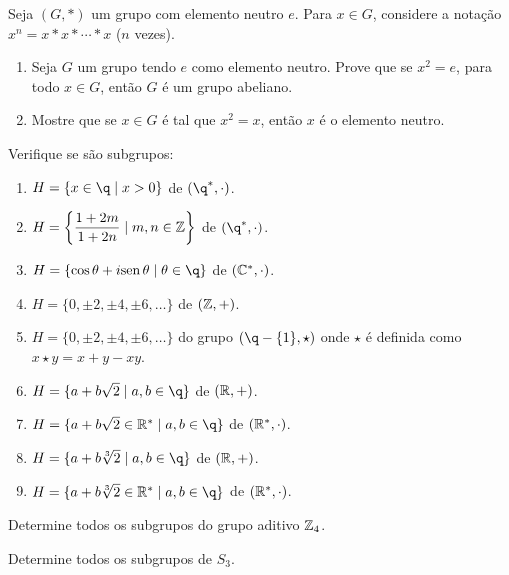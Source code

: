 \documentclass[12pt]{article}
\begin{document}
\vesp

\questao Seja $(G,*)$ um grupo com elemento neutro $e$. Para $x\in
G$, considere a nota{\c c}{\~a}o $x^n=x*x*\cdots *x$ ($n$ vezes).
\begin{enumerate}[label=({\alph*})]
\item Seja $G$ um grupo tendo $e$ como elemento neutro. Prove que se
$x^2=e$, para todo $x\in G$, ent{\~a}o $G$ {\'e} um grupo abeliano.
\item Mostre que se $x\in G$ {\'e} tal que $x^2=x$, ent{\~a}o $x$ {\'e} o elemento neutro.
\end{enumerate}

\vesp

\questao Verifique se s\~ao subgrupos:
\begin{enumerate}[label=({\alph*})]
	\item $H = \{x \in \q \mid x > 0\}$ de $(\q^*,\cdot)$.
	\item $H = \left\{\dfrac{1 + 2m}{1 + 2n} \mid m, n \in \mathbb{Z}\right\}$ de $(\q^*,\cdot)$.
	\item $H = \{\cos\theta + i\sin\theta \mid \theta \in \q\}$ de $(\mathbb{C}^*,\cdot)$.
	\item $H = \{0, \pm 2, \pm 4, \pm 6, \dots\}$ de $(\mathbb{Z},+)$.
	\item $H = \{0, \pm 2, \pm 4, \pm 6, \dots\}$ do grupo $(\q - \{1\},\star)$ onde $\star$ \'e definida como $x \star y = x + y - xy$.
	\item $H = \{a + b\sqrt{2} \mid a, b \in \q\}$ de $(\mathbb{R},+)$.
	\item $H = \{a + b\sqrt{2} \in \real^* \mid a, b \in \q\}$ de $(\mathbb{R}^*,\cdot)$.
	\item $H = \{a + b\sqrt[3]{2} \mid a, b \in \q\}$ de $(\mathbb{R},+)$.
	\item $H = \{a + b\sqrt[3]{2} \in \real^* \mid a, b \in \q\}$ de $(\mathbb{R}^*,\cdot)$.
\end{enumerate}

\vesp

\questao Determine todos os subgrupos do grupo aditivo $\mathbb{Z}_4$.

\vesp

\questao Determine todos os subgrupos de $S_3$.

\vesp
\end{document}
